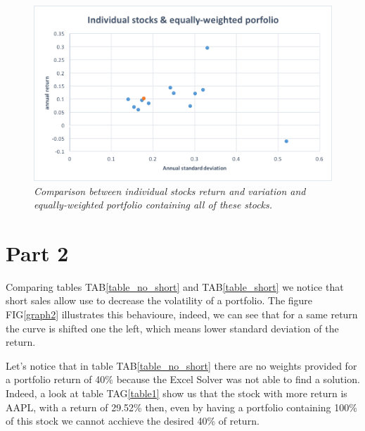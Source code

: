 \documentclass[a4paper,11pt,twoside]{article}
\begin{document}
\begin{figure}[H] %
\begin{center}
\includegraphics[width=12cm]{pic/graph_1.png} 
\end{center}
\caption{\em  \label{graph1}
Comparison between individual stocks return and variation and equally-weighted portfolio containing all of these stocks.
}
\end{figure}

																						


\section{Part 2}
Comparing tables TAB\ref{table_no_short} and TAB\ref{table_short} we notice that short sales allow use to decrease the volatility of a portfolio. The figure FIG\ref{graph2} illustrates this behavioure, indeed, we can see that for a same return the curve is shifted one the left, which means lower standard deviation of the return.

Let's notice that in table TAB\ref{table_no_short} there are no weights provided for a portfolio return of 40\% because the Excel Solver was not able to find a solution. Indeed, a look at table TAG\ref{table1} show us that the stock with more return is AAPL, with a return of 29.52\% then, even by having a portfolio containing 100\% of this stock we cannot acchieve the desired 40\% of return.
\end{document}

